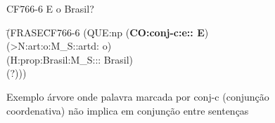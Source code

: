 \begin{figure}[!h]
    \centering
    \begin{minipage}{10cm}
        CF766-6 E o Brasil?
        \begin{tabbing}
            \=(FRASE\=  CF766-6 (QUE:np (\textbf{CO:conj-c:e:: E})\+\\
            \>    (>N:art:o:M\_S::artd: o)\\
            \>    (H:prop:Brasil:M\_S::: Brasil)\\
            \>    (?)))\\
        \end{tabbing}
    \end{minipage}
    \caption[Exemplo árvore onde palavra marcada por conj-c não implica em conjunção entre sentenças]{Exemplo árvore onde palavra marcada por conj-c (conjunção coordenativa) não implica em conjunção entre sentenças}
    \label{fig:bosque_exemplo_conj-c}
\end{figure}